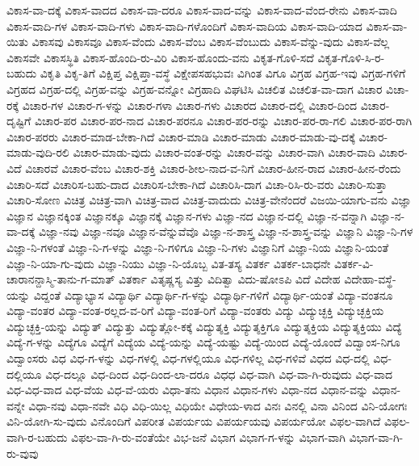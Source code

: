 {ವಿಕಾಸ-ವಾ-ದಕ್ಕೆ
ವಿಕಾಸ-ವಾದದ
ವಿಕಾಸ-ವಾ-ದರೂ
ವಿಕಾಸ-ವಾದ-ವನ್ನು
ವಿಕಾಸ-ವಾದ-ವೆಂದ-ರೇನು
ವಿಕಾಸ-ವಾದಿ
ವಿಕಾಸ-ವಾದಿ-ಗಳ
ವಿಕಾಸ-ವಾದಿ-ಗಳು
ವಿಕಾಸ-ವಾದಿ-ಗಳೊಂದಿಗೆ
ವಿಕಾಸ-ವಾದಿಯ
ವಿಕಾಸ-ವಾದಿ-ಯಾದ
ವಿಕಾಸ-ವಾ-ಯಿತು
ವಿಕಾಸವು
ವಿಕಾಸವೂ
ವಿಕಾಸ-ವೆಂದು
ವಿಕಾಸ-ವೆಂಬ
ವಿಕಾಸ-ವೆಂಬುದು
ವಿಕಾಸ-ವೆನ್ನು-ವುದು
ವಿಕಾಸ-ವೆಲ್ಲ
ವಿಕಾಸವೇ
ವಿಕಾಸಸ್ಥಿತಿ
ವಿಕಾಸ-ಹೊಂದಿ-ರು-ವಿರಿ
ವಿಕಾಸ-ಹೊಂದು-ವನು
ವಿಕೃತ-ಗೊಳಿ-ಸದೆ
ವಿಕೃತ-ಗೊಳಿ-ಸಿ-ರ-ಬಹುದು
ವಿಕೃತಿ
ವಿಕೃ-ತಿಗೆ
ವಿಕ್ಷಿಪ್ತ
ವಿಕ್ಷಿಪ್ತಾ-ವಸ್ಥೆ
ವಿಕ್ಷೇಪಸಹಭುವಃ
ವಿಗಿಂತ
ವಿಗೂ
ವಿಗ್ರಹ
ವಿಗ್ರಹ-ಇವು
ವಿಗ್ರಹ-ಗಳಿಗೆ
ವಿಗ್ರಹದ
ವಿಗ್ರಹ-ದಲ್ಲಿ
ವಿಗ್ರಹ-ವನ್ನು
ವಿಗ್ರಹ-ವನ್ನೋ
ವಿಗ್ರಹಾದಿ
ವಿಘಟಿಸಿ
ವಿಚಲಿತ
ವಿಚಲಿತ-ವಾ-ದಾಗ
ವಿಚಾರ
ವಿಚಾ-ರಕ್ಕೆ
ವಿಚಾರ-ಗಳ
ವಿಚಾರ-ಗ-ಳನ್ನು
ವಿಚಾರ-ಗಳಾ
ವಿಚಾರ-ಗಳು
ವಿಚಾರದ
ವಿಚಾರ-ದಲ್ಲಿ
ವಿಚಾರ-ದಿಂದ
ವಿಚಾರ-ದೃಷ್ಟಿಗೆ
ವಿಚಾರ-ಪರ
ವಿಚಾರ-ಪರ-ನಾದ
ವಿಚಾರ-ಪರನೂ
ವಿಚಾರ-ಪರ-ರನ್ನು
ವಿಚಾರ-ಪರ-ರಾ-ಗಲಿ
ವಿಚಾರ-ಪರ-ರಾಗಿ
ವಿಚಾರ-ಪರರು
ವಿಚಾರ-ಮಾಡ-ಬೇಕಾ-ಗಿದೆ
ವಿಚಾರ-ಮಾಡಿ
ವಿಚಾರ-ಮಾಡು
ವಿಚಾರ-ಮಾಡು-ವು-ದಕ್ಕೆ
ವಿಚಾರ-ಮಾಡು-ವುದಿ-ರಲಿ
ವಿಚಾರ-ಮಾಡು-ವುದು
ವಿಚಾರ-ವಂತ-ರನ್ನು
ವಿಚಾರ-ವನ್ನು
ವಿಚಾರ-ವಾಗಿ
ವಿಚಾರ-ವಾದಿ
ವಿಚಾರ-ವಿದೆ
ವಿಚಾರವೆ
ವಿಚಾರ-ವೆಂಬ
ವಿಚಾರ-ಶಕ್ತಿ
ವಿಚಾರ-ಶೀಲ-ನಾದ-ವ-ನಿಗೆ
ವಿಚಾರ-ಹೀನ-ರಾದ
ವಿಚಾರ-ಹೀನ-ರೆಂದು
ವಿಚಾರಿ-ಸದೆ
ವಿಚಾರಿಸ-ಬಹು-ದಾದ
ವಿಚಾರಿಸ-ಬೇಕಾ-ಗಿದೆ
ವಿಚಾರಿಸಿ-ದಾಗ
ವಿಚಾ-ರಿಸಿ-ರು-ವರು
ವಿಚಾರಿ-ಸುತ್ತಾ
ವಿಚಾರಿ-ಸೋಣ
ವಿಚಿತ್ರ
ವಿಚಿತ್ರ-ವಾಗಿ
ವಿಚಿತ್ರ-ವಾದ
ವಿಚಿತ್ರ-ವಾದುದು
ವಿಚಿತ್ರ-ವೇನೆಂದರೆ
ವಿಜಯಿ-ಯಾಗು-ವನು
ವಿಜ್ಞಾ
ವಿಜ್ಞಾನ
ವಿಜ್ಞಾನಕ್ಕಿಂತ
ವಿಜ್ಞಾನಕ್ಕೂ
ವಿಜ್ಞಾನಕ್ಕೆ
ವಿಜ್ಞಾನ-ಗಳು
ವಿಜ್ಞಾ-ನದ
ವಿಜ್ಞಾನ-ದಲ್ಲಿ
ವಿಜ್ಞಾ-ನ-ವನ್ನಾಗಿ
ವಿಜ್ಞಾ-ನ-ವಾ-ದಕ್ಕೆ
ವಿಜ್ಞಾ-ನವು
ವಿಜ್ಞಾ-ನವೂ
ವಿಜ್ಞಾನ-ವೆನ್ನುವೆವೊ
ವಿಜ್ಞಾ-ನ-ಶಾಸ್ತ್ರ
ವಿಜ್ಞಾ-ನ-ಶಾಸ್ತ್ರ-ವನ್ನು
ವಿಜ್ಞಾನಿ
ವಿಜ್ಞಾ-ನಿ-ಗಳ
ವಿಜ್ಞಾ-ನಿ-ಗಳಂತೆ
ವಿಜ್ಞಾ-ನಿ-ಗ-ಳನ್ನು
ವಿಜ್ಞಾ-ನಿ-ಗಳಿಗೂ
ವಿಜ್ಞಾ-ನಿ-ಗಳು
ವಿಜ್ಞಾನಿಗೆ
ವಿಜ್ಞಾ-ನಿಯ
ವಿಜ್ಞಾನಿ-ಯಂತೆ
ವಿಜ್ಞಾ-ನಿ-ಯಾ-ಗು-ವುದು
ವಿಜ್ಞಾ-ನಿಯು
ವಿಜ್ಞಾ-ನಿ-ಯೊಬ್ಬ
ವಿತ-ತಸ್ಯ
ವಿತರ್ಕ
ವಿತರ್ಕ-ಬಾಧನೇ
ವಿತರ್ಕ-ವಿ-ಚಾರಾನನ್ದಾಸ್ಮಿ-ತಾನು-ಗ-ಮಾತ್
ವಿತರ್ಕಾ
ವಿತೃಷ್ಣಸ್ಯ
ವಿತ್ತು
ವಿದಿತ್ವಾ
ವಿದು-ಷೋಽಪಿ
ವಿದೆ
ವಿದೇಹ
ವಿದೇಹಾ-ವಸ್ಥೆ-ಯನ್ನು
ವಿದ್ದಂತೆ
ವಿದ್ಯಾಭ್ಯಾಸ
ವಿದ್ಯಾರ್ಥಿ
ವಿದ್ಯಾರ್ಥಿ-ಗ-ಳನ್ನು
ವಿದ್ಯಾರ್ಥಿ-ಗಳಿಗೆ
ವಿದ್ಯಾರ್ಥಿ-ಯಂತೆ
ವಿದ್ಯಾ-ವಂತನೂ
ವಿದ್ಯಾ-ವಂತರ
ವಿದ್ಯಾ-ವಂತ-ರಲ್ಲದ-ವ-ರಿಗೆ
ವಿದ್ಯಾ-ವಂತ-ರಿಗೆ
ವಿದ್ಯಾ-ವಂತರು
ವಿದ್ಯು
ವಿದ್ಯುಚ್ಛಕ್ತಿ
ವಿದ್ಯುಚ್ಛಕ್ತಿಯ
ವಿದ್ಯುಚ್ಛಕ್ತಿ-ಯನ್ನು
ವಿದ್ಯುತ್
ವಿದ್ಯುತ್ತು
ವಿದ್ಯುತ್ಲೋ-ಕಕ್ಕೆ
ವಿದ್ಯುತ್ಶಕ್ತಿ
ವಿದ್ಯುತ್ಶಕ್ತಿಗೂ
ವಿದ್ಯುತ್ಶಕ್ತಿಯ
ವಿದ್ಯುತ್ಶಕ್ತಿಯು
ವಿದ್ಯೆ
ವಿದ್ಯೆ-ಗ-ಳನ್ನು
ವಿದ್ಯೆಗೂ
ವಿದ್ಯೆಗೆ
ವಿದ್ಯೆಯ
ವಿದ್ಯೆ-ಯನ್ನು
ವಿದ್ಯೆ-ಯಷ್ಟು
ವಿದ್ಯೆ-ಯಿಂದ
ವಿದ್ಯೆ-ಯೊಂದೆ
ವಿದ್ವಾಂಸ-ನಿಗೂ
ವಿದ್ವಾಂಸರು
ವಿಧ
ವಿಧ-ಗ-ಳನ್ನು
ವಿಧ-ಗಳಲ್ಲಿ
ವಿಧ-ಗಳಲ್ಲಿಯೂ
ವಿಧ-ಗಳಿಲ್ಲ
ವಿಧ-ಗಳಿವೆ
ವಿಧದ
ವಿಧ-ದಲ್ಲಿ
ವಿಧ-ದಲ್ಲಿಯೂ
ವಿಧ-ದಲ್ಲೂ
ವಿಧ-ದಿಂದ
ವಿಧ-ದಿಂದ-ಲಾ-ದರೂ
ವಿಧಧ
ವಿಧ-ವಾಗಿ
ವಿಧ-ವಾ-ಗಿ-ರುವುದು
ವಿಧ-ವಾದ
ವಿಧ-ವಿಧ-ವಾದ
ವಿಧ-ವೆಯ
ವಿಧ-ವೆ-ಯರು
ವಿಧಾ-ತನು
ವಿಧಾನ
ವಿಧಾನ-ಗಳು
ವಿಧಾ-ನದ
ವಿಧಾನ-ವನ್ನು
ವಿಧಾನ-ವನ್ನೇ
ವಿಧಾ-ನವು
ವಿಧಾ-ನವೇ
ವಿಧಿ
ವಿಧಿ-ಯಿಲ್ಲ
ವಿಧಿಯೇ
ವಿಧೇಯ-ಳಾದ
ವಿನಃ
ವಿನಲ್ಲಿ
ವಿನಾ
ವಿನಿಂದ
ವಿನಿ-ಯೋಗಃ
ವಿನಿ-ಯೋಗಿ-ಸು-ವುದು
ವಿನೊಂದಿಗೆ
ವಿಪರೀತ
ವಿಪರ್ಯಯ
ವಿಪರ್ಯಯವು
ವಿಪರ್ಯಯೋ
ವಿಫಲ-ವಾಗಿದೆ
ವಿಫಲ-ವಾಗಿ-ರ-ಬಹುದು
ವಿಫಲ-ವಾ-ಗಿ-ರು-ವಂತೆಯೇ
ವಿಭ-ಜನೆ
ವಿಭಾಗ
ವಿಭಾಗ-ಗ-ಳನ್ನು
ವಿಭಾಗ-ವಾಗಿ
ವಿಭಾಗ-ವಾ-ಗಿ-ರು-ವುವು
}
